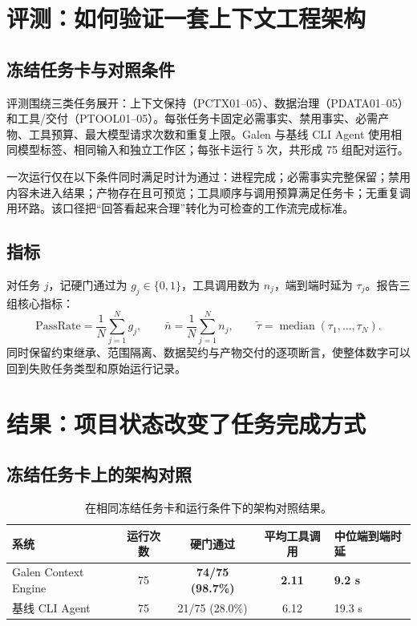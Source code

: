 \documentclass[10pt,a4paper]{article}
\begin{document}
\section{评测：如何验证一套上下文工程架构}
\subsection{冻结任务卡与对照条件}
评测围绕三类任务展开：上下文保持（PCTX01--05）、数据治理（PDATA01--05）和工具/交付（PTOOL01--05）。每张任务卡固定必需事实、禁用事实、必需产物、工具预算、最大模型请求次数和重复上限。Galen 与基线 CLI Agent 使用相同模型标签、相同输入和独立工作区；每张卡运行 5 次，共形成 75 组配对运行。

一次运行仅在以下条件同时满足时计为通过：进程完成；必需事实完整保留；禁用内容未进入结果；产物存在且可预览；工具顺序与调用预算满足任务卡；无重复调用环路。该口径把“回答看起来合理”转化为可检查的工作流完成标准。

\subsection{指标}
对任务 $j$，记硬门通过为 $g_j\in\{0,1\}$，工具调用数为 $n_j$，端到端时延为 $\tau_j$。报告三组核心指标：
\[
\text{PassRate}=\frac{1}{N}\sum_{j=1}^{N}g_j,\qquad
\bar{n}=\frac{1}{N}\sum_{j=1}^{N}n_j,\qquad
\widetilde{\tau}=\operatorname{median}(\tau_1,\ldots,\tau_N).
\]
同时保留约束继承、范围隔离、数据契约与产物交付的逐项断言，使整体数字可以回到失败任务类型和原始运行记录。

\section{结果：项目状态改变了任务完成方式}
\subsection{冻结任务卡上的架构对照}
\begin{table}[H]
\centering\small
\begin{tabularx}{\linewidth}{@{}YcccY@{}}
\toprule
系统 & 运行次数 & 硬门通过 & 平均工具调用 & 中位端到端时延 \\
\midrule
Galen Context Engine & 75 & \textbf{74/75 (98.7\%)} & \textbf{2.11} & \textbf{9.2 s} \\
基线 CLI Agent & 75 & 21/75 (28.0\%) & 6.12 & 19.3 s \\
\bottomrule
\end{tabularx}
\caption{在相同冻结任务卡和运行条件下的架构对照结果。}
\label{tab:main-result}
\end{table}
\end{document}
